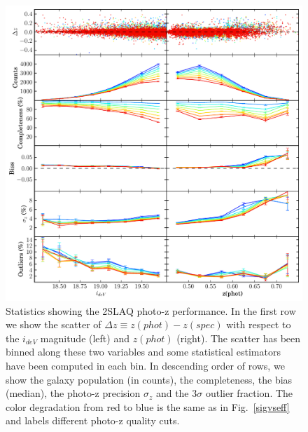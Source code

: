 \begin{figure}
\centering
\includegraphics[type=pdf,ext=.pdf,read=.pdf, width=135mm]{./plots/2slaq_DR7}
\caption{Statistics showing the 2SLAQ photo-z performance. In the first row we show the scatter of $\Delta z \equiv z(phot) - z(spec)$ with respect to the $i_{deV}$ magnitude (left) and $z(phot)$ (right). The scatter has been binned along these two variables and some statistical estimators have been computed in each bin. In descending order of rows, we show the galaxy population (in counts), the completeness, the bias (median), the photo-z precision $\sigma_z$ and the 3$\sigma$ outlier fraction. The color degradation from red to blue is the same as in Fig.~\ref{sigvseff} and labels different photo-z quality cuts.}
\label{2slaq_pz_results}
\end{figure}

